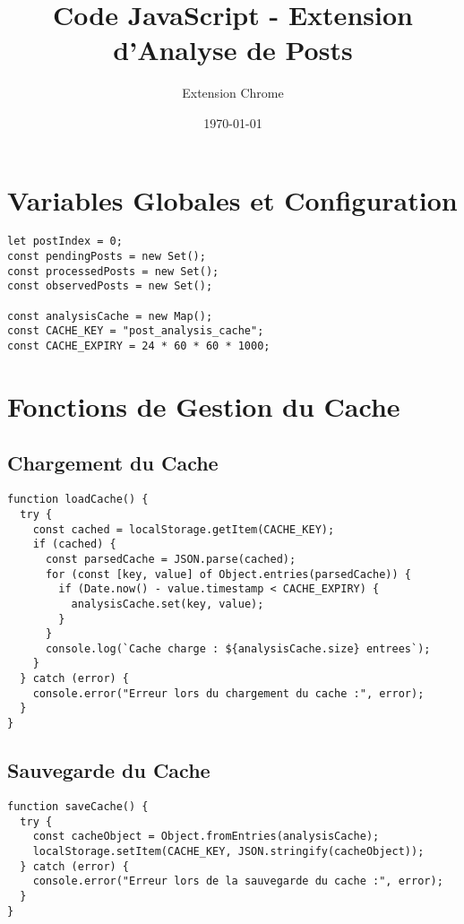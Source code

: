 \documentclass[12pt,a4paper]{article}
\title{\textbf{Code JavaScript - Extension d'Analyse de Posts}}
\author{Extension Chrome}
\date{\today}
\begin{document}
\maketitle
\tableofcontents
\newpage

\section{Variables Globales et Configuration}

\begin{lstlisting}
let postIndex = 0;
const pendingPosts = new Set();
const processedPosts = new Set();
const observedPosts = new Set();

const analysisCache = new Map();
const CACHE_KEY = "post_analysis_cache";
const CACHE_EXPIRY = 24 * 60 * 60 * 1000;
\end{lstlisting}

\section{Fonctions de Gestion du Cache}

\subsection{Chargement du Cache}

\begin{lstlisting}
function loadCache() {
  try {
    const cached = localStorage.getItem(CACHE_KEY);
    if (cached) {
      const parsedCache = JSON.parse(cached);
      for (const [key, value] of Object.entries(parsedCache)) {
        if (Date.now() - value.timestamp < CACHE_EXPIRY) {
          analysisCache.set(key, value);
        }
      }
      console.log(`Cache charge : ${analysisCache.size} entrees`);
    }
  } catch (error) {
    console.error("Erreur lors du chargement du cache :", error);
  }
}
\end{lstlisting}

\subsection{Sauvegarde du Cache}

\begin{lstlisting}
function saveCache() {
  try {
    const cacheObject = Object.fromEntries(analysisCache);
    localStorage.setItem(CACHE_KEY, JSON.stringify(cacheObject));
  } catch (error) {
    console.error("Erreur lors de la sauvegarde du cache :", error);
  }
}
\end{lstlisting}
\end{document}
